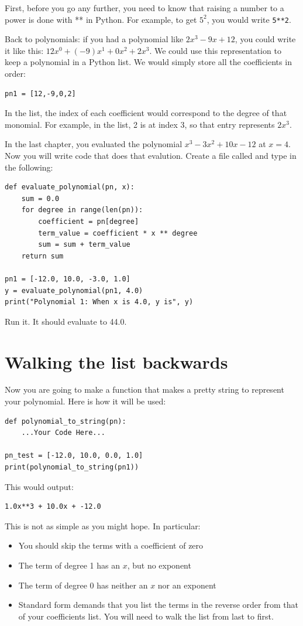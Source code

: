 First, before you go any further, you need to know that raising a
number to a power is done with ** in Python.  For example, to get
$5^2$, you would write \texttt{5**2}.

Back to polynomials: if you had a polynomial like $2x^3 -9x + 12$, you
could write it like this: $12x^0 + (-9)x^1 + 0x^2 + 2x^3$.  We could
use this representation to keep a polynomial in a Python list. We
would simply store all the coefficients in order:
\begin{Verbatim}
pn1 = [12,-9,0,2]
\end{Verbatim}

In the list, the index of each coefficient would correspond to the
degree of that monomial. For example, in the list, 2 is at index 3, so
that entry represents $2x^3$.

In the last chapter, you evaluated the polynomial $x^3 - 3x^2 + 10x -
12$ at $x=4$. Now you will write code that does that evalution.
Create a file called  and type in the following:

\begin{Verbatim}
def evaluate_polynomial(pn, x):
    sum = 0.0  
    for degree in range(len(pn)):
        coefficient = pn[degree]
        term_value = coefficient * x ** degree
        sum = sum + term_value
    return sum
   
pn1 = [-12.0, 10.0, -3.0, 1.0]
y = evaluate_polynomial(pn1, 4.0)
print("Polynomial 1: When x is 4.0, y is", y)
\end{Verbatim}

Run it. It should evaluate to 44.0.

\section{Walking the list backwards}

Now you are going to make a function that makes a pretty string to
represent your polynomial. Here is how it will be used:
\begin{Verbatim}
def polynomial_to_string(pn):
    ...Your Code Here...

pn_test = [-12.0, 10.0, 0.0, 1.0]
print(polynomial_to_string(pn1))
\end{Verbatim}

This would output:
\begin{Verbatim}
1.0x**3 + 10.0x + -12.0
\end{Verbatim}
This is not as simple as you might hope. In particular:
\begin{itemize}
\item You should skip the terms with a coefficient of zero
\item The term of degree 1 has an $x$, but no exponent
\item The term of degree 0 has neither an $x$ nor an exponent
\item Standard form demands that you list the terms in the reverse
  order from that of your coefficients list. You will need to walk the
  list from last to first.
\end{itemize}

